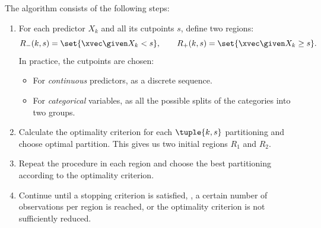 The algorithm consists of the following steps:
\begin{enumerate}[beginpenalty=10000]
    \item For each predictor $X_k$ and all its cutpoints $s$, define two regions:
          \begin{equation}
              R_-(k, s) = \set{\xvec\given X_k < s}, \qquad R_+(k, s) = \set{\xvec\given X_k \geq s}.
          \end{equation}
          In practice, the cutpoints are chosen:
          \begin{itemize}
              \item For \emph{continuous} predictors, as a discrete sequence.
              \item For \emph{categorical} variables, as all the possible splits of the categories into two groups.
          \end{itemize}
    \item Calculate the optimality criterion for each $\tuple{k, s}$ partitioning and choose optimal partition. This gives us two initial regions $R_1$ and $R_2$.
    \item Repeat the procedure in each region and choose the best partitioning according to the optimality criterion.
    \item Continue until a stopping criterion is satisfied, \eg, a certain number of observations per region is reached, or the optimality criterion is not sufficiently reduced.
\end{enumerate}

